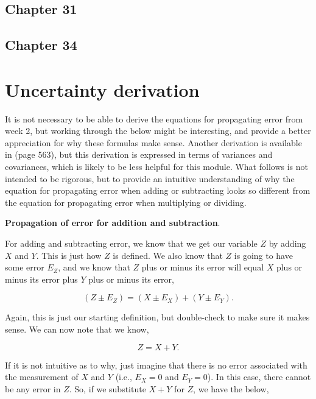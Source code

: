 \documentclass[
]{scrbook}
\begin{document}
\hypertarget{chapter-31}{%
\section{Chapter 31}\label{chapter-31}}

\hypertarget{chapter-34}{%
\section{Chapter 34}\label{chapter-34}}

\hypertarget{uncertainty_derivation}{%
\chapter{Uncertainty derivation}\label{uncertainty_derivation}}

It is not necessary to be able to derive the equations for propagating error from week 2, but working through the below might be interesting, and provide a better appreciation for why these formulas make sense.
Another derivation is available in \citet{Box1978} (page 563), but this derivation is expressed in terms of variances and covariances, which is likely to be less helpful for this module.
What follows is not intended to be rigorous, but to provide an intuitive understanding of why the equation for propagating error when adding or subtracting looks so different from the equation for propagating error when multiplying or dividing.

\textbf{Propagation of error for addition and subtraction}.

For adding and subtracting error, we know that we get our variable \(Z\) by adding \(X\) and \(Y\). This is just how \(Z\) is defined. We also know that \(Z\) is going to have some error \(E_Z\), and we know that \(Z\) plus or minus its error will equal \(X\) plus or minus its error plus \(Y\) plus or minus its error,

\[(Z \pm E_Z) = (X  \pm E_X) + (Y \pm E_Y).\]

Again, this is just our starting definition, but double-check to make sure it makes sense. We can now note that we know,

\[Z =X+Y.\]

If it is not intuitive as to why, just imagine that there is no error associated with the measurement of \(X\) and \(Y\) (i.e., \(E_{X} = 0\) and \(E_{Y} = 0\)).
In this case, there cannot be any error in \(Z\). So, if we substitute \(X + Y\) for \(Z\), we have the below,
\end{document}
